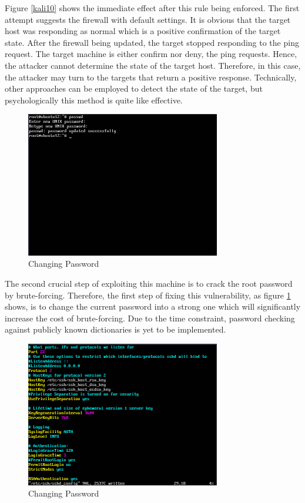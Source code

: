 \documentclass{article}
\begin{document}
Figure \ref{kali10} shows the immediate effect after this rule being enforced. The first attempt suggests the firewall 
with default settings. It is obvious that the target host was responding as normal which is a positive 
confirmation of the target state. After the firewall being updated, the target stopped responding to the ping request. 
The target machine is either confirm nor deny, the ping requests. Hence, the attacker cannot determine the state of 
the target host. Therefore, in this case, the attacker may turn to the targets that return a positive response. 
Technically, other approaches can be employed to detect the state of the target, but psychologically this method is 
quite like effective.

\begin{figure}[H]
  \includegraphics[width=8.5cm]{ubuntu8}
  \caption{Changing Password}
  \label{ubuntu8}
\end{figure}

The second crucial step of exploiting this machine is to crack the root password by brute-forcing. 
Therefore, the first step of fixing this vulnerability, as figure \ref{ubuntu8} shows, is to change the current password into a strong one which 
will significantly increase the cost of brute-forcing. Due to the time constraint, password checking against 
publicly known dictionaries is yet to be implemented.

\begin{figure}[H]
  \includegraphics[width=8.5cm]{ubuntu6}
  \caption{Changing Password}
  \label{ubuntu6}
\end{figure}
\end{document}
